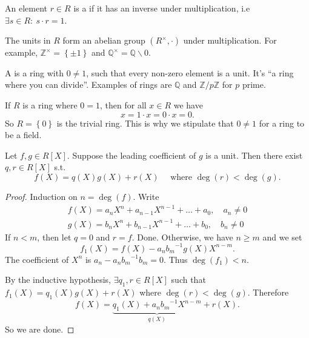 \documentclass[egregdoesnotlikesansseriftitles,a4paper]{scrartcl}
\begin{document}
\begin{definition*}[Unit]
       An element $r \in R$ is a  if it has an inverse under multiplication, i.e $\exists s \in R: \ s \cdot r=1$.

       The units in $R$ form an abelian group $(R^{\times},\cdot )$ under multiplication. For example, $\mathbb{Z}^{\times}=\left\{\pm 1\right\}$ and $\mathbb{Q}^{\times}=\mathbb{Q}\backslash 0$. 
\end{definition*}
\begin{definition*}[Field]
       A  is a ring with $0 \neq 1$, such that every non-zero element is a unit. It's ``a ring where you can divide''. Examples of rings are $\mathbb{Q} $ and $\mathbb{Z}/p\mathbb{Z}$ for $p$ prime.
\end{definition*}
\begin{remark}
       If $R$ is a ring where $0=1$, then for all $x \in R$ we have \[
       x=1 \cdot x =0 \cdot x=0
       .\] So $R=\left\{0\right\}$ is the trivial ring. This is why we stipulate that $0 \neq 1$ for a ring to be a field.
\end{remark}
\begin{proposition}\label{euclidrings}
       Let $f,g \in R[X]$. Suppose the leading coefficient of $g$ is a unit. Then there exist $q, r \in R[X]$ s.t. \[
       f (X)=q (X)g (X)+r (X) \quad \text{ where } \operatorname{deg}(r) < \operatorname{deg}(g)
       .\] 
       \begin{proof}
            Induction on $n=\operatorname{deg}(f)$. Write \begin{align*}
                  f (X)= a_{n}X^{n}+a_{n-1}X^{n-1}+ \ldots +a_0 , \quad a_{n}\neq 0\\
                  g (X)= b_{n}X^{n}+b_{n-1}X^{n-1}+ \ldots +b_0 , \quad b_{n}\neq 0
            \end{align*}
            If $n<m$, then let $q=0$ and $r=f$. Done. Otherwise, we have $n \geq m$ and we set \[
            f_1 (X)= f (X)-a_{n} {b_{m}}^{-1} g (X) X ^{n-m}
            .\] The coefficient of $X^{n}$ is $a_{n}-a_{n}{b_{m}}^{-1}b_{m}=0$. Thus  $\operatorname{deg}(f_{1})<n$. 
            
            By the inductive hypothesis, $\exists q_1 ,r \in R[X]$ such that $f_1 (X)=q_1 (X)g (X)+r (X)$ where $\operatorname{deg}(r) < \operatorname{deg}(g)$. Therefore \[
            f (X)=\underbrace{q_1 (X)+a_n {b_{m}}^{-1} X ^{n-m}}_{q (X)}+r (X) 
            .\] So we are done. 
     \end{proof}
\end{proposition}
\end{document}

